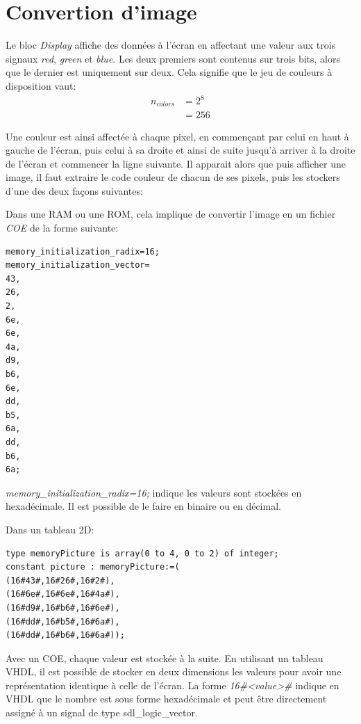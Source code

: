 \documentclass[french]{nakrule}
\begin{document}
\symmetricalPage

\section{Convertion d'image}
\label{sec:convertPicture}

Le bloc \emph{Display} affiche des données à l'écran en affectant une valeur aux
trois signaux \emph{red}, \emph{green} et \emph{blue}. Les deux premiers sont
contenus sur trois bits, alors que le dernier est uniquement sur deux. Cela
signifie que le jeu de couleurs à disposition vaut:
\begin{align*}
  n_{colors} &= 2^{8}\\
             &= 256
\end{align*}

Une couleur est ainsi affectée à chaque pixel, en commençant par celui en haut à
gauche de l'écran, puis celui à sa droite et ainsi de suite jusqu'à arriver à la
droite de l'écran et commencer la ligne suivante. Il apparait alors que puis
afficher une image, il faut extraire le code couleur de chacun de ses pixels,
puis les stockers d'une des deux façons suivantes:\vspace{.1in}
\begin{items}
\item Dans une RAM ou une ROM, cela implique de convertir l'image en un fichier
  \emph{COE} de la forme suivante:
  \begin{lstlisting}[frame=single, basicstyle=\scriptsize, backgroundcolor=\color{backcolor}]
memory_initialization_radix=16;
memory_initialization_vector=
43,
26,
2,
6e,
6e,
4a,
d9,
b6,
6e,
dd,
b5,
6a,
dd,
b6,
6a;
\end{lstlisting}
\emph{memory\_initialization\_radix=16;} indique les valeurs sont stockées en
hexadécimale. Il est possible de le faire en binaire ou en décimal.
\item Dans un tableau 2D:
  \begin{lstlisting}[style=vhdl]
type memoryPicture is array(0 to 4, 0 to 2) of integer;
constant picture : memoryPicture:=(
(16#43#,16#26#,16#2#),
(16#6e#,16#6e#,16#4a#),
(16#d9#,16#b6#,16#6e#),
(16#dd#,16#b5#,16#6a#),
(16#dd#,16#b6#,16#6a#));
  \end{lstlisting}
\end{items}

Avec un COE, chaque valeur est stockée à la suite. En utilisant un tableau VHDL,
il est possible de stocker en deux dimensions les valeurs pour avoir une
représentation identique à celle de l'écran. La forme \emph{16\#<value>\#} indique
en VHDL que le nombre est sous forme hexadécimale et peut être directement
assigné à un signal de type sdl\_logic\_vector.
\end{document}
